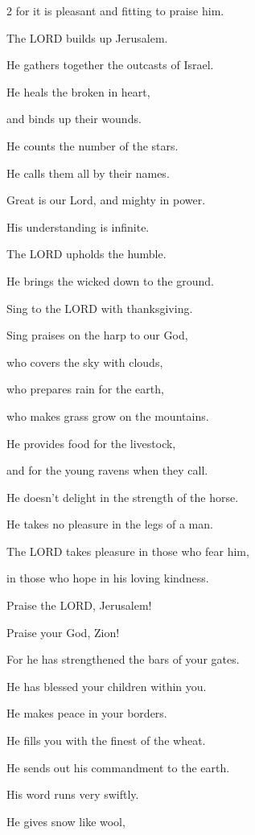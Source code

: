 \begin{multicols}{2}
	for it is pleasant and fitting to praise him.
	
	
	\myverse{}The LORD builds up Jerusalem.
	
	He gathers together the outcasts of Israel.
	
	
	\myverse{}He heals the broken in heart,
	
	and binds up their wounds.
	
	
	\myverse{}He counts the number of the stars.
	
	He calls them all by their names.
	
	
	\myverse{}Great is our Lord, and mighty in power.
	
	His understanding is infinite.
	
	
	\myverse{}The LORD upholds the humble.
	
	He brings the wicked down to the ground.
	
	
	\myverse{}Sing to the LORD with thanksgiving.
	
	Sing praises on the harp to our God,
	
	
	\myverse{}who covers the sky with clouds,
	
	who prepares rain for the earth,
	
	who makes grass grow on the mountains.
	
	
	\myverse{}He provides food for the livestock,
	
	and for the young ravens when they call.
	
	
	\myverse{}He doesn’t delight in the strength of the horse.
	
	He takes no pleasure in the legs of a man.
	
	
	\myverse{}The LORD takes pleasure in those who fear him,
	
	in those who hope in his loving kindness.
	
	
	\myverse{}Praise the LORD, Jerusalem!
	
	Praise your God, Zion!
	
	
	\myverse{}For he has strengthened the bars of your gates.
	
	He has blessed your children within you.
	
	
	\myverse{}He makes peace in your borders.
	
	He fills you with the finest of the wheat.
	
	
	\myverse{}He sends out his commandment to the earth.
	
	His word runs very swiftly.
	
	
	\myverse{}He gives snow like wool,
	

\end{multicols}
